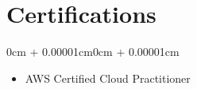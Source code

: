 \documentclass[10pt, letterpaper]{article}
\newenvironment{highlights}{
    \begin{itemize}[
        topsep=0.10cm,
        parsep=0.10cm,
        partopsep=0pt,
        itemsep=0pt,
        leftmargin=0cm + 10pt
    ]
}{
    \end{itemize}
}
\newenvironment{onecolentry}{
    \begin{adjustwidth}{0cm + 0.00001cm}{0cm + 0.00001cm}
}{
    \end{adjustwidth}
}
\begin{document}
    \section{Certifications}

        \begin{onecolentry}
            \begin{highlights}
                \item AWS Certified Cloud Practitioner
            \end{highlights}
        \end{onecolentry}
\end{document}
